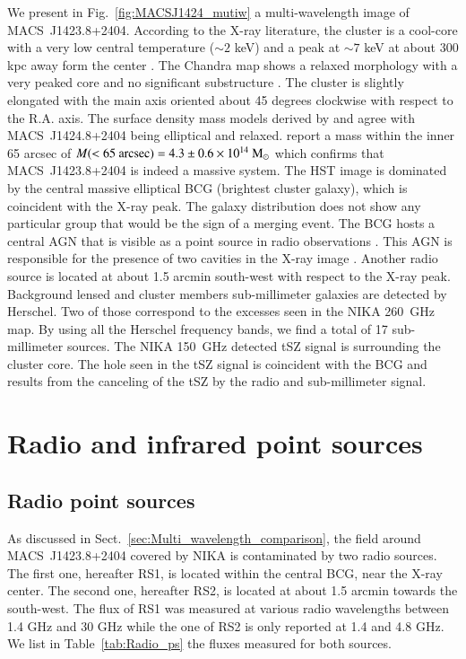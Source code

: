 \documentclass[twocolumn,traditabstract]{aa}
\begin{document}
We present in Fig.~\ref{fig:MACSJ1424_mutiw} a multi-wavelength image of \mbox{MACS~J1423.8+2404}. According to the X-ray literature, the cluster is a cool-core \citep[e.g.][]{kartaltepe2008} with a very low central temperature ($\sim 2$ keV) and a peak at $\sim 7$ keV at about 300 kpc away form the center \citep{morandi2010}. The Chandra map shows a relaxed morphology with a very peaked core and no significant substructure \citep{guennou2014}. The cluster is slightly elongated with the main axis oriented about 45 degrees clockwise with respect to the R.A. axis. The surface density mass models derived by \cite{limousin2010} and \cite{zitrin2011} agree with \mbox{MACS~J1424.8+2404} being elliptical and relaxed. \cite{limousin2010} report a mass within the inner 65 arcsec of $M(<65 \ {\rm arcsec}) = 4.3 \pm 0.6 \times 10^{14} \ {\rm M}_{\odot}$ which confirms that \mbox{MACS~J1423.8+2404} is indeed a massive system. The HST image is dominated by the central massive elliptical BCG (brightest cluster galaxy), which is coincident with the X-ray peak. The galaxy distribution does not show any particular group that would be the sign of a merging event. The BCG hosts a central AGN that is visible as a point source in radio observations \citep{laroque2003,condon1998,coble2007,bonamente2012}. This AGN is responsible for the presence of two cavities in the X-ray image \citep{hlavacek_larrondo2012}. Another radio source is located at about 1.5 arcmin south-west with respect to the X-ray peak. Background lensed and cluster members sub-millimeter galaxies are detected by Herschel. Two of those correspond to the excesses seen in the NIKA 260~GHz map. By using all the Herschel frequency bands, we find a total of 17 sub-millimeter sources. The NIKA 150~GHz detected tSZ signal is surrounding the cluster core. The hole seen in the tSZ signal is coincident with the BCG and results from the canceling of the tSZ by the radio and sub-millimeter signal.

\section{Radio and infrared point sources}\label{Radio_and_infrared_point_sources}
\subsection{Radio point sources}
As discussed in Sect.~\ref{sec:Multi_wavelength_comparison}, the field around \mbox{MACS~J1423.8+2404} covered by NIKA is contaminated by two radio sources. The first one, hereafter RS1, is located within the central BCG, near the X-ray center. The second one, hereafter RS2, is located at about 1.5 arcmin towards the south-west. The flux of RS1 was measured at various radio wavelengths between 1.4 GHz and 30 GHz while the one of RS2 is only reported at 1.4 and 4.8 GHz. We list in Table~\ref{tab:Radio_ps} the fluxes measured for both sources.
\end{document}
